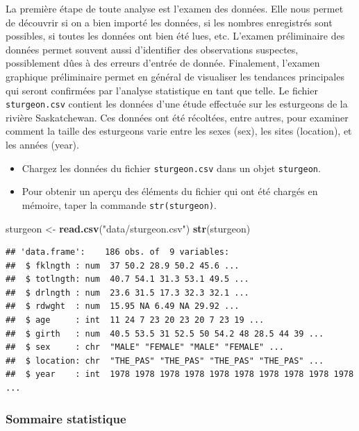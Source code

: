 \documentclass[12pt,]{book}
\newenvironment{Shaded}{\begin{snugshade}}{\end{snugshade}}
\newcommand{\KeywordTok}[1]{\textcolor[rgb]{0.27,0.27,0.27}{\textbf{#1}}}
\newcommand{\NormalTok}[1]{#1}
\newcommand{\StringTok}[1]{\textcolor[rgb]{0.5,0.5,0.5}{#1}}
\providecommand{\tightlist}{%
  \setlength{\itemsep}{0pt}\setlength{\parskip}{0pt}}
\begin{document}
La première étape de toute analyse est l'examen des données.
Elle nous permet de découvrir si on a bien importé les données, si les nombres enregistrés sont possibles, si toutes les données ont bien été lues, etc.
L'examen préliminaire des données permet souvent aussi d'identifier des observations suspectes, possiblement dûes à des erreurs d'entrée de donnée.
Finalement, l'examen graphique préliminaire permet en général de visualiser les tendances principales qui seront confirmées par l'analyse statistique en tant que telle.
Le fichier \texttt{sturgeon.csv} contient les données d'une étude effectuée sur les esturgeons de la rivière Saskatchewan.
Ces données ont été récoltées, entre autres, pour examiner comment la taille des esturgeons varie entre les sexes (sex), les sites (location), et les années (year).

\begin{itemize}
\tightlist
\item
  Chargez les données du fichier \texttt{sturgeon.csv} dans un objet \texttt{sturgeon}.
\item
  Pour obtenir un aperçu des éléments du fichier qui ont été chargés en mémoire, taper la commande \texttt{str(sturgeon)}.
\end{itemize}

\begin{Shaded}
\begin{Highlighting}[]
\NormalTok{sturgeon <-}\StringTok{ }\KeywordTok{read.csv}\NormalTok{(}\StringTok{"data/sturgeon.csv"}\NormalTok{)}
\KeywordTok{str}\NormalTok{(sturgeon)}
\end{Highlighting}
\end{Shaded}

\begin{verbatim}
## 'data.frame':	186 obs. of  9 variables:
##  $ fklngth : num  37 50.2 28.9 50.2 45.6 ...
##  $ totlngth: num  40.7 54.1 31.3 53.1 49.5 ...
##  $ drlngth : num  23.6 31.5 17.3 32.3 32.1 ...
##  $ rdwght  : num  15.95 NA 6.49 NA 29.92 ...
##  $ age     : int  11 24 7 23 20 23 20 7 23 19 ...
##  $ girth   : num  40.5 53.5 31 52.5 50 54.2 48 28.5 44 39 ...
##  $ sex     : chr  "MALE" "FEMALE" "MALE" "FEMALE" ...
##  $ location: chr  "THE_PAS" "THE_PAS" "THE_PAS" "THE_PAS" ...
##  $ year    : int  1978 1978 1978 1978 1978 1978 1978 1978 1978 1978 ...
\end{verbatim}

\hypertarget{sommaire-statistique}{%
\subsubsection{Sommaire statistique}\label{sommaire-statistique}}
\end{document}
